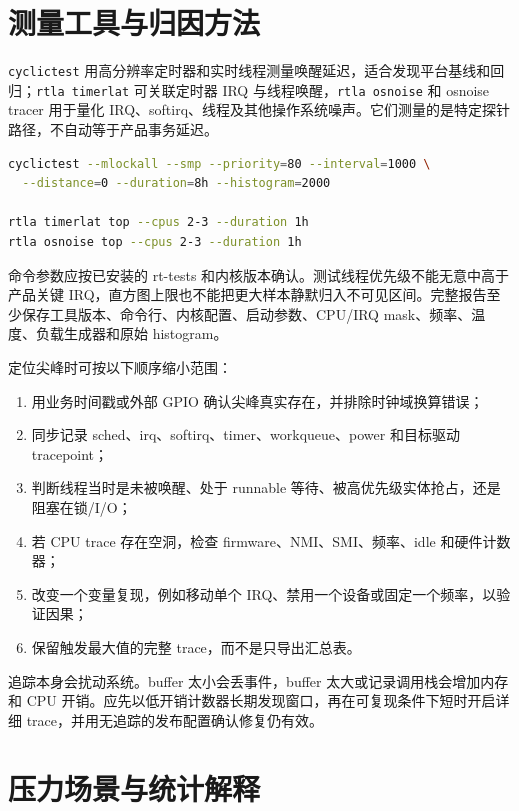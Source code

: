 \section{测量工具与归因方法}

\texttt{cyclictest} 用高分辨率定时器和实时线程测量唤醒延迟，适合发现平台基线和回归；\texttt{rtla timerlat} 可关联定时器 IRQ 与线程唤醒，\texttt{rtla osnoise} 和 osnoise tracer 用于量化 IRQ、softirq、线程及其他操作系统噪声\cite{linux-rtla,linux-osnoise}。它们测量的是特定探针路径，不自动等于产品事务延迟。

\begin{lstlisting}[language=bash,caption={实时延迟与操作系统噪声测试示意}]
cyclictest --mlockall --smp --priority=80 --interval=1000 \
  --distance=0 --duration=8h --histogram=2000

rtla timerlat top --cpus 2-3 --duration 1h
rtla osnoise top --cpus 2-3 --duration 1h
\end{lstlisting}

命令参数应按已安装的 rt-tests 和内核版本确认。测试线程优先级不能无意中高于产品关键 IRQ，直方图上限也不能把更大样本静默归入不可见区间。完整报告至少保存工具版本、命令行、内核配置、启动参数、CPU/IRQ mask、频率、温度、负载生成器和原始 histogram。

定位尖峰时可按以下顺序缩小范围：

\begin{enumerate}
  \item 用业务时间戳或外部 GPIO 确认尖峰真实存在，并排除时钟域换算错误；
  \item 同步记录 sched、irq、softirq、timer、workqueue、power 和目标驱动 tracepoint；
  \item 判断线程当时是未被唤醒、处于 runnable 等待、被高优先级实体抢占，还是阻塞在锁/I/O；
  \item 若 CPU trace 存在空洞，检查 firmware、NMI、SMI、频率、idle 和硬件计数器；
  \item 改变一个变量复现，例如移动单个 IRQ、禁用一个设备或固定一个频率，以验证因果；
  \item 保留触发最大值的完整 trace，而不是只导出汇总表。
\end{enumerate}

追踪本身会扰动系统。buffer 太小会丢事件，buffer 太大或记录调用栈会增加内存和 CPU 开销。应先以低开销计数器长期发现窗口，再在可复现条件下短时开启详细 trace，并用无追踪的发布配置确认修复仍有效。

\section{压力场景与统计解释}

